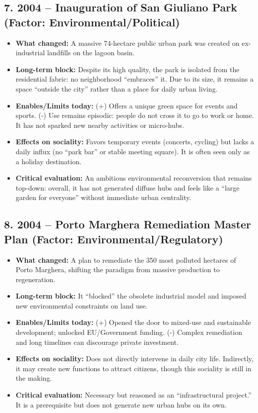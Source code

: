 \documentclass[a4paper,11pt]{article}
\begin{document}
\subsection*{7. 2004 – Inauguration of San Giuliano Park (Factor: Environmental/Political)}
\begin{itemize}
    \item \textbf{What changed:} A massive 74-hectare public urban park was created on ex-industrial landfills on the lagoon basin.
    \item \textbf{Long-term block:} Despite its high quality, the park is isolated from the residential fabric: no neighborhood ``embraces'' it. Due to its size, it remains a space ``outside the city'' rather than a place for daily urban living.
    \item \textbf{Enables/Limits today:} (+) Offers a unique green space for events and sports. (-) Use remains episodic: people do not cross it to go to work or home. It has not sparked new nearby activities or micro-hubs.
    \item \textbf{Effects on sociality:} Favors temporary events (concerts, cycling) but lacks a daily influx (no ``park bar'' or stable meeting square). It is often seen only as a holiday destination.
    \item \textbf{Critical evaluation:} An ambitious environmental reconversion that remains top-down: overall, it has not generated diffuse hubs and feels like a ``large garden for everyone'' without immediate urban centrality.
\end{itemize}

\subsection*{8. 2004 – Porto Marghera Remediation Master Plan (Factor: Environmental/Regulatory)}
\begin{itemize}
    \item \textbf{What changed:} A plan to remediate the 350 most polluted hectares of Porto Marghera, shifting the paradigm from massive production to regeneration.
    \item \textbf{Long-term block:} It ``blocked'' the obsolete industrial model and imposed new environmental constraints on land use.
    \item \textbf{Enables/Limits today:} (+) Opened the door to mixed-use and sustainable development; unlocked EU/Government funding. (-) Complex remediation and long timelines can discourage private investment.
    \item \textbf{Effects on sociality:} Does not directly intervene in daily city life. Indirectly, it may create new functions to attract citizens, though this sociality is still in the making.
    \item \textbf{Critical evaluation:} Necessary but reasoned as an ``infrastructural project.'' It is a prerequisite but does not generate new urban hubs on its own.
\end{itemize}
\end{document}

